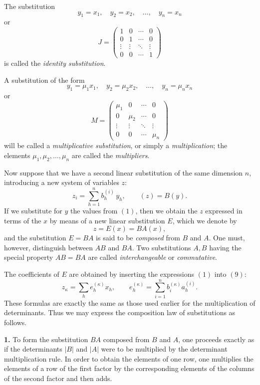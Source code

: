 \documentclass[11pt]{article}
\begin{document}
The substitution
\[
y_1=x_1,\quad y_2=x_2,\quad \dots,\quad y_n=x_n
\tag{5}
\]
or
\[
J=
\begin{pmatrix}
1 & 0 & \cdots & 0\\
0 & 1 & \cdots & 0\\
\vdots & \vdots & \ddots & \vdots\\
0 & 0 & \cdots & 1
\end{pmatrix}
\tag{6}
\]
is called the \emph{identity substitution}.

A substitution of the form
\[
y_1=\mu_1x_1,\quad y_2=\mu_2x_2,\quad \dots,\quad y_n=\mu_nx_n
\tag{7}
\]
or
\[
M=
\begin{pmatrix}
\mu_1 & 0 & \cdots & 0\\
0 & \mu_2 & \cdots & 0\\
\vdots & \vdots & \ddots & \vdots\\
0 & 0 & \cdots & \mu_n
\end{pmatrix}
\tag{8}
\]
will be called a \emph{multiplicative substitution}, or simply a \emph{multiplication}; the elements \(\mu_1,\mu_2,\dots,\mu_n\) are called the \emph{multipliers}.

Now suppose that we have a second linear substitution of the same dimension \(n\), introducing a new system of variables \(z\):
\[
z_i=\sum_{h=1}^n b^{(i)}_h\,y_h,\qquad (z)=B(y).
\tag{9}
\]
If we substitute for \(y\) the values from \((1)\), then we obtain the \(z\) expressed in terms of the \(x\) by means of a new linear substitution \(E\), which we denote by
\[
z=E(x)=BA(x),
\tag{10}
\]
and the substitution \(E=BA\) is said to be \emph{composed} from \(B\) and \(A\). One must, however, distinguish between \(AB\) and \(BA\). Two substitutions \(A,B\) having the special property \(AB=BA\) are called \emph{interchangeable} or \emph{commutative}.

The coefficients of \(E\) are obtained by inserting the expressions \((1)\) into \((9)\):
\[
z_\kappa=\sum_h e^{(\kappa)}_h x_h,\qquad
e^{(\kappa)}_h=\sum_{i=1}^n b^{(\kappa)}_i a^{(i)}_h.
\tag{11}
\]
These formulas are exactly the same as those used earlier for the multiplication of determinants. Thus we may express the composition law of substitutions as follows.

\medskip
\noindent\textbf{1.}
To form the substitution \(BA\) composed from \(B\) and \(A\), one proceeds exactly as if the determinants \(|B|\) and \(|A|\) were to be multiplied by the determinant multiplication rule. In order to obtain the elements of one row, one multiplies the elements of a row of the first factor by the corresponding elements of the columns of the second factor and then adds.
\end{document}
